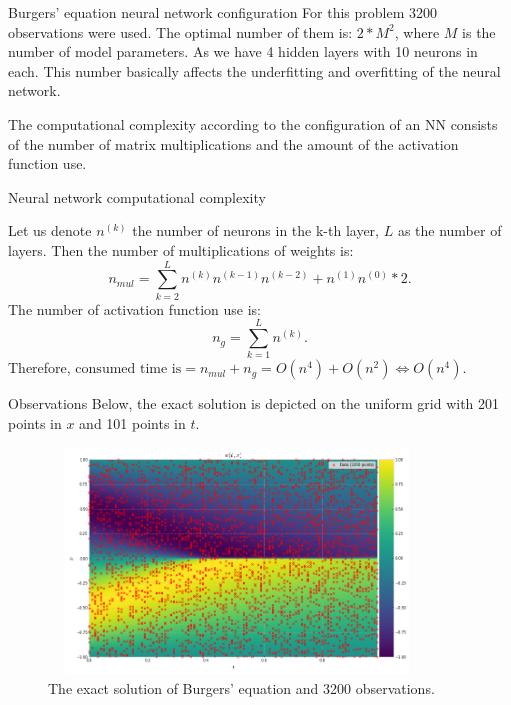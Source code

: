 \documentclass{beamer}
\def\\{}%
\begin{document}
\begin{frame}{Burgers' equation neural network configuration}
    For this problem 3200 observations were used. The optimal number of them is: $2*M^2$, where $M$ is the number of model parameters. As we have 4 hidden layers with 10 neurons in each. This number basically affects the underfitting and overfitting of the neural network. \\
    
    The computational complexity according to the configuration of an NN consists of the number of matrix multiplications and the amount of the activation function use. 
    
\end{frame}

\begin{frame}{Neural network computational complexity}

    Let us denote $n^{(k)}$ the number of neurons in the k-th layer, $L$ as the number of layers. Then the number of multiplications of weights is: $$n_{mul} = \sum_{k=2}^{L} n^{(k)}n^{(k-1)}n^{(k-2)} + n^{(1)}n^{(0)}*2.$$
    The number of activation function use is: $$n_g = \sum_{k = 1}^{L} n^{(k)}.$$ Therefore, $ \text{consumed time is} = n_{mul} + n_g = O(n^4) + O(n^2) \Longleftrightarrow O(n^4).$ 
    
\end{frame}

\begin{frame}{Observations}
\small
Below, the exact solution is depicted on the uniform grid with 201 points in $x$ and 101 points in $t$. 
\begin{figure}
    \centering
    \includegraphics[width=10cm, height=6cm]{images/burgers-exact.png}
    \caption{The exact solution of Burgers' equation and 3200 observations.}
    \label{fig:my_label}
\end{figure}

\end{frame}
\end{document}
